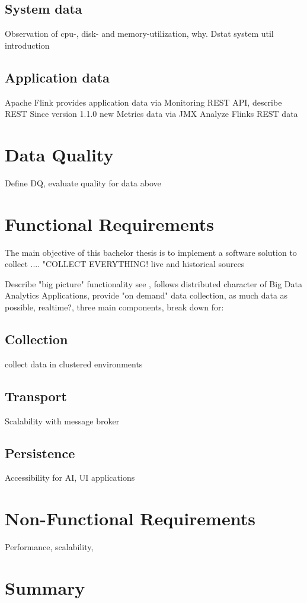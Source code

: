 \subsection{System data}

Observation of cpu-, disk- and memory-utilization, why.
Dstat system util introduction

\subsection{Application data}

Apache Flink provides application data via Monitoring REST API, describe REST
Since version 1.1.0 new Metrics data via JMX
Analyze Flinks REST data

\section{Data Quality}

Define DQ, evaluate quality for data above

\section{Functional Requirements}

The main objective of this bachelor thesis is to implement a software solution to collect ....
"COLLECT EVERYTHING!
live and historical sources

Describe "big picture" functionality see \cite{VanL14}, follows distributed character of Big Data Analytics
Applications, provide "on demand" data collection, as much data as possible, realtime?, three main components,
break down for:

\subsection{Collection}

collect data in clustered environments

\subsection{Transport}

Scalability with message broker

\subsection{Persistence}

Accessibility for AI, UI applications

\section{Non-Functional Requirements}

Performance, scalability,

\section{Summary}
